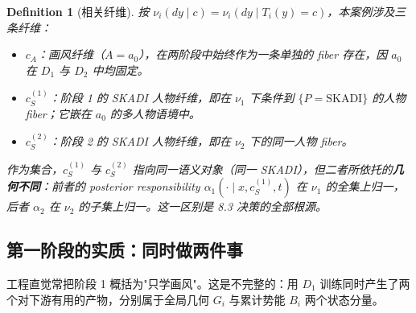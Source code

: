 \documentclass[11pt,a4paper]{article}
\newtheorem{definition}[theorem]{Definition}
\begin{document}
\begin{definition}[相关纤维]\label{s8:def-fibers}
按 $\nu_i(dy\mid c)=\nu_i(dy\mid T_i(y)=c)$，本案例涉及三条纤维：
\begin{itemize}
\item $c_A$：\emph{画风纤维}（$A=a_0$），在两阶段中始终作为一条单独的 fiber 存在，因 $a_0$ 在 $D_1$ 与 $D_2$ 中均固定。
\item $c_S^{(1)}$：\emph{阶段 1 的 SKADI 人物纤维}，即在 $\nu_1$ 下条件到 $\{P=\mathrm{SKADI}\}$ 的人物 fiber；它嵌在 $a_0$ 的多人物语境中。
\item $c_S^{(2)}$：\emph{阶段 2 的 SKADI 人物纤维}，即在 $\nu_2$ 下的同一人物 fiber。
\end{itemize}
作为集合，$c_S^{(1)}$ 与 $c_S^{(2)}$ 指向同一语义对象（同一 SKADI），但二者所依托的\textbf{几何不同}：前者的 posterior responsibility $\alpha_1(\cdot\mid x,c_S^{(1)},t)$ 在 $\nu_1$ 的全集上归一，后者 $\alpha_2$ 在 $\nu_2$ 的子集上归一。这一区别是 8.3 决策的全部根源。
\end{definition}

\subsection{第一阶段的实质：同时做两件事}\label{s8:stage1}

工程直觉常把阶段 1 概括为"只学画风"。这是不完整的：用 $D_1$ 训练同时产生了两个对下游有用的产物，分别属于全局几何 $G_i$ 与累计势能 $B_i$ 两个状态分量。
\end{document}
